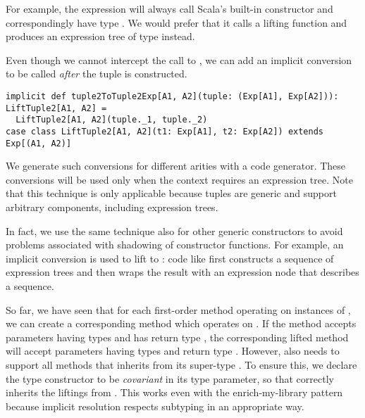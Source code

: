 For example, the expression  will always call Scala's built-in  constructor and correspondingly have type . We would prefer that it calls a lifting function and produces an expression tree of type  instead.

Even though we cannot intercept the call to , we can add an implicit conversion to be called \emph{after} the tuple is constructed.

\begin{lstlisting}
implicit def tuple2ToTuple2Exp[A1, A2](tuple: (Exp[A1], Exp[A2])): LiftTuple2[A1, A2] =
  LiftTuple2[A1, A2](tuple._1, tuple._2)
case class LiftTuple2[A1, A2](t1: Exp[A1], t2: Exp[A2]) extends Exp[(A1, A2)]
\end{lstlisting}

We generate such conversions for different arities with a code generator. These conversions will be used only when the context requires an expression tree. Note that this technique is only applicable because tuples are generic and support arbitrary components, including expression trees.

In fact, we use the same technique also for other generic constructors to avoid problems associated with shadowing of constructor functions. For example, an implicit conversion is used to lift  to : code like  first constructs a sequence of expression trees and then wraps the result with an expression node that describes a sequence.

So far, we have seen that for each first-order method  operating on instances of , we can create a corresponding method which operates on . If the method accepts parameters having types  and has return type , the corresponding lifted method will accept parameters having types  and return type . However,  also needs to support all methods that  inherits from its super-type . To ensure this, we declare the type constructor  to be \emph{covariant} in its type parameter, so that  correctly inherits the liftings from . This works even with the enrich-my-library pattern because implicit resolution respects subtyping in an appropriate way.

